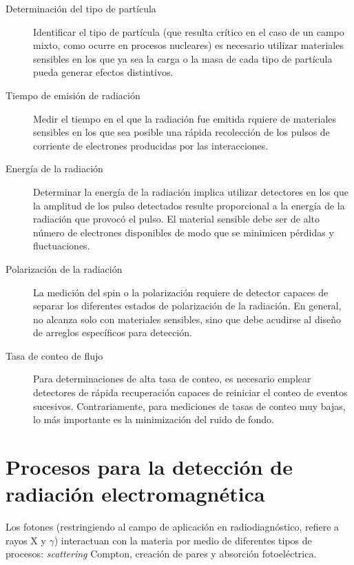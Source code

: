 \begin{description}
 \item[Determinaci\'on del tipo de part\'icula] Identificar el tipo de part\'icula (que resulta cr\'itico en el caso de un campo mixto,
 como ocurre en procesos nucleares) es necesario utilizar materiales sensibles en los que ya sea la carga o la masa de cada tipo de
 part\'icula pueda generar efectos distintivos.
 \item[Tiempo de emisi\'on de radiaci\'on] Medir el tiempo en el que la radiaci\'on fue emitida rquiere de materiales sensibles en los 
 que sea posible una r\'apida recolecci\'on de los pulsos de corriente de electrones producidas por las interacciones.
 \item[Energ\'ia de la radiaci\'on] Determinar la energ\'ia de la radiaci\'on implica utilizar detectores en los que la amplitud de los 
 pulso detectados resulte proporcional a la energ\'ia de la radiaci\'on que provoc\'o el pulso. El material sensible debe ser 
 de alto n\'umero de electrones disponibles de modo que se minimicen p\'erdidas y fluctuaciones.
 \item[Polarizaci\'on de la radiaci\'on] La medici\'on del spin o la polarizaci\'on requiere de detector capaces de separar los diferentes 
 estados de polarizaci\'on de la radiaci\'on. En general, no alcanza solo con materiales sensibles, sino que debe acudirse al dise\~no de 
 arreglos espec\'ificos para detecci\'on.
 \item[Tasa de conteo de flujo] Para determinaciones de alta tasa de conteo, es necesario emplear detectores de r\'apida 
 recuperaci\'on capaces de reiniciar el conteo de eventos sucesivos. Contrariamente, para mediciones de tasas de conteo muy bajas,
 lo m\'as importante es la minimizaci\'on del ruido de fondo.
\end{description}

\section{Procesos para la detecci\'on de radiaci\'on electromagn\'etica}
\label{CapIII_1}

Los fotones (restringiendo al campo de aplicaci\'on en radiodiagn\'ostico, refiere a rayos X y $\gamma$) interactuan con la materia 
por medio de diferentes tipos de procesos: \textit{scattering} Compton, creaci\'on de pares y absorci\'on fotoel\'ectrica.

